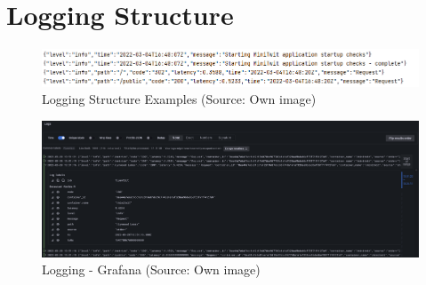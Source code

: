 \section{Logging Structure}\label{app:logging_structure}


\begin{figure}[H]
    \centering
    \includegraphics[width = \linewidth]{images/logging/logging_structure_1.png}
    \caption{Logging Structure Examples (Source: Own image)}
    \label{fig:loggingStructure}
\end{figure}


\begin{figure}[H]
    \centering
    \includegraphics[width = \linewidth]{images/monitoring/logging_1.png}
    \caption{Logging - Grafana (Source: Own image)}
    \label{fig:grafana-dashboard-Logging}
\end{figure}



